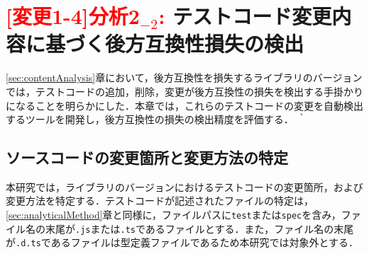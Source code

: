 \documentclass[submit]{ipsj}
\begin{document}
{\vspace{-2mm}
\section{\textcolor{red}{[変更1-4]分析2$_{-2}$: }テストコード変更内容に基づく後方互換性損失の検出}\label{chap:rq2}

\ref{sec:contentAnalysis}章において，後方互換性を損失するライブラリのバージョンでは，テストコードの追加，削除，変更が後方互換性の損失を検出する手掛かりになることを明らかにした．本章では，これらのテストコードの変更を自動検出するツールを開発し，後方互換性の損失の検出精度を評価する．
｀


\subsection{ソースコードの変更箇所と変更方法の特定}\label{subsec:rq2.astseisei}
本研究では，ライブラリのバージョンにおけるテストコードの変更箇所，および変更方法を特定する．テストコードが記述されたファイルの特定は，\ref{sec:analyticalMethod}章と同様に，ファイルパスに{\verb|test|}または{\verb|spec|}を含み，ファイル名の末尾が{\verb|.js|}または{\verb|.ts|}であるファイルとする．また，ファイル名の末尾が{\verb|.d.ts|}であるファイルは型定義ファイルであるため本研究では対象外とする．

}
\end{document}
